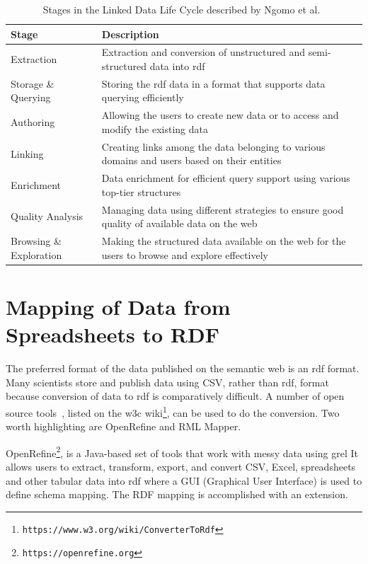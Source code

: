 \begin{doublespace}
\begin{table}[h!]
    \centering
    
    \caption{Stages in the Linked Data Life Cycle described by Ngomo et al.~\cite{ngomo2014introduction}}
    \label{ldlc-stages}

    \begin{tabular}{|l|p{10cm}|} \hline 
     {\bf Stage} & {\bf Description} \\ \hline
     Extraction & Extraction and conversion of unstructured and semi-structured data into \ac{rdf}\\ \hline
     Storage \& Querying & Storing the \ac{rdf} data in a format that supports data querying efficiently\\ \hline
     Authoring & Allowing the users to create new data or to access and 
     modify the existing data\\ \hline
     Linking & Creating links among the data belonging to various domains and users based on their entities\\ \hline
     Enrichment & Data enrichment for efficient query support using various top-tier structures\\ \hline
     Quality Analysis & Managing data using different strategies to ensure good quality of available data on the web\\ \hline
     Browsing \& Exploration & Making the structured data available on the web for the users to browse and explore effectively\\ \hline
    \end{tabular}
    \end{table}

\section{Mapping of Data from Spreadsheets to RDF}
\label{sec:csvtordf}

The preferred format of the data published on the semantic web is an \ac{rdf} format. 
Many scientists store and publish data using CSV, rather than \ac{rdf},
format because conversion of data to \ac{rdf} 
is comparatively difficult. 
A number of open source tools~\cite{ermilov2013csv},
listed on the \ac{w3c} 
wiki\footnote{\tt https://www.w3.org/wiki/ConverterToRdf},
can be used to do the conversion. Two worth highlighting are OpenRefine and RML Mapper.

OpenRefine\footnote{\tt https://openrefine.org},  
    is a Java-based set of tools that work with messy data using \ac{grel}
    It allows users to extract, transform, export, and convert 
    CSV, Excel, spreadsheets and other tabular data into \ac{rdf} 
    where a GUI (Graphical User Interface) is used to define schema mapping.
    The RDF mapping is accomplished with an extension. 
   

\end{doublespace}
